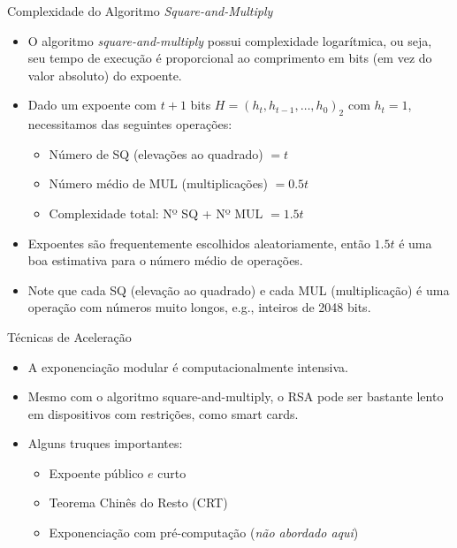 \documentclass{beamer}
\begin{document}
\begin{frame}{Complexidade do Algoritmo \textit{Square-and-Multiply}}
    \begin{itemize}
        \item O algoritmo \textit{square-and-multiply} possui complexidade logarítmica, ou seja, seu tempo de execução é proporcional ao comprimento em bits (em vez do valor absoluto) do expoente.
        \vspace{0.5em}
        \item Dado um expoente com $t+1$ bits $H = (h_t, h_{t-1}, \dots, h_0)_2$ com $h_t=1$, necessitamos das seguintes operações:
        \begin{itemize}
            \item Número de SQ (elevações ao quadrado) $= t$
            \item Número médio de MUL (multiplicações) $= 0.5t$
            \item Complexidade total: Nº SQ + Nº MUL $= 1.5t$
        \end{itemize}
        \vspace{0.5em}
        \item Expoentes são frequentemente escolhidos aleatoriamente, então $1.5t$ é uma boa estimativa para o número médio de operações.
        \vspace{0.5em}
        \item Note que cada SQ (elevação ao quadrado) e cada MUL (multiplicação) é uma operação com números muito longos, e.g., inteiros de 2048 bits.
    \end{itemize}
\end{frame}

\begin{frame}{Técnicas de Aceleração}
    \begin{itemize}
        \item A exponenciação modular é computacionalmente intensiva.
        \vspace{0.5em}
        \item Mesmo com o algoritmo square-and-multiply, o RSA pode ser bastante lento em dispositivos com restrições, como smart cards.
        \vspace{0.5em}
        \item Alguns truques importantes:
        \begin{itemize}
            \item Expoente público $e$ curto
            \vspace{0.5em}
            \item Teorema Chinês do Resto (CRT)
            \vspace{0.5em}
            \item Exponenciação com pré-computação (\textit{não abordado aqui})
        \end{itemize}
    \end{itemize}
\end{frame}
\end{document}
